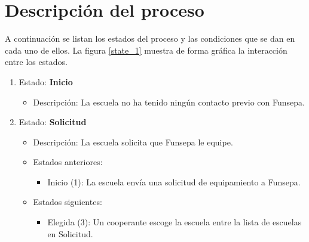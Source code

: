 \documentclass[11pt]{report}
\begin{document}
	\section{Descripción del proceso}
	A continuación se listan los estados del proceso y las condiciones que se dan en cada uno de ellos. La figura \ref{state_1} muestra de forma gráfica la interacción entre los estados.
	\begin{enumerate}
		\item Estado: \textbf{Inicio}
		\begin{itemize}
			\item Descripción: La escuela no ha tenido ningún contacto previo con Funsepa.
		\end{itemize}
		
		\item Estado: \textbf{Solicitud}
		\begin{itemize}
			\item Descripción: La escuela solicita que Funsepa le equipe.
			\item Estados anteriores:
			\begin{itemize}
				\item Inicio (1): La escuela envía una solicitud de equipamiento a Funsepa.
			\end{itemize}
			
			\item Estados siguientes:
			\begin{itemize}
				\item Elegida (3): Un cooperante escoge la escuela entre la lista de escuelas en Solicitud.
			\end{itemize}
			

\end{itemize}
\end{enumerate}
\end{document}
